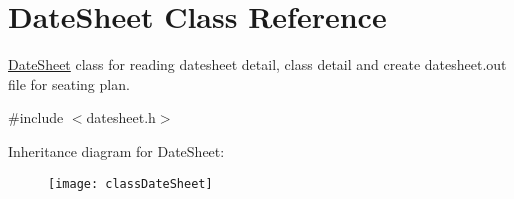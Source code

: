 \hypertarget{classDateSheet}{\section{\-Date\-Sheet \-Class \-Reference}
\label{classDateSheet}
}


\hyperlink{classDateSheet}{\-Date\-Sheet} class for reading datesheet detail, class detail and create datesheet.\-out file for seating plan.  




{\ttfamily \#include $<$datesheet.\-h$>$}

\-Inheritance diagram for \-Date\-Sheet\-:\begin{figure}[H]
\begin{center}
\leavevmode
\texttt{[image: classDateSheet]}
\end{center}
\end{figure}
